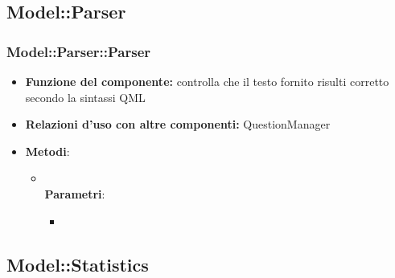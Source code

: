 \subsection{Model::Parser}
\subsubsection{Model::Parser::Parser}
\begin{itemize}
\item\textbf{Funzione del componente:} controlla che il testo fornito risulti corretto secondo la sintassi QML
\item\textbf{Relazioni d'uso con altre componenti:} QuestionManager\\
\item\textbf{Metodi}:
	\begin{itemize}
		\item{}\\
		\textbf{Parametri}:
			\begin{itemize}
				\item{}\\
			\end{itemize}
	\end{itemize}
\end{itemize}

\subsection{Model::Statistics}
